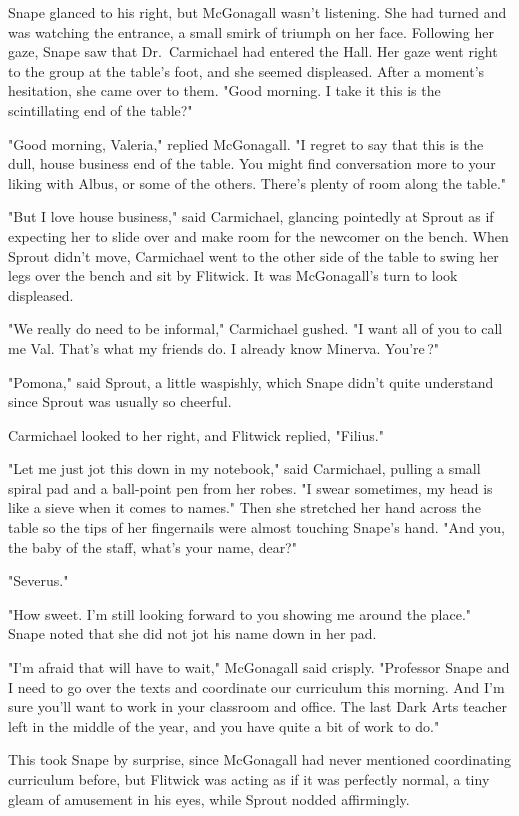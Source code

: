 Snape glanced to his right, but McGonagall wasn't listening. She had turned and was watching the entrance, a small smirk of triumph on her face. Following her gaze, Snape saw that Dr.~Carmichael had entered the Hall. Her gaze went right to the group at the table's foot, and she seemed displeased. After a moment's hesitation, she came over to them. "Good morning. I take it this is the scintillating end of the table?"

"Good morning, Valeria," replied McGonagall. "I regret to say that this is the dull, house business end of the table. You might find conversation more to your liking with Albus, or some of the others. There's plenty of room along the table."

"But I love house business," said Carmichael, glancing pointedly at Sprout as if expecting her to slide over and make room for the newcomer on the bench. When Sprout didn't move, Carmichael went to the other side of the table to swing her legs over the bench and sit by Flitwick. It was McGonagall's turn to look displeased.

"We really do need to be informal," Carmichael gushed. "I want all of you to call me Val. That's what my friends do. I already know Minerva. You're{\el}\,?"

"Pomona," said Sprout, a little waspishly, which Snape didn't quite understand since Sprout was usually so cheerful.

Carmichael looked to her right, and Flitwick replied, "Filius."

"Let me just jot this down in my notebook," said Carmichael, pulling a small spiral pad and a ball-point pen from her robes. "I swear sometimes, my head is like a sieve when it comes to names." Then she stretched her hand across the table so the tips of her fingernails were almost touching Snape's hand. "And you, the baby of the staff, what's your name, dear?"

"Severus."

"How sweet. I'm still looking forward to you showing me around the place." Snape noted that she did not jot his name down in her pad.

"I'm afraid that will have to wait," McGonagall said crisply. "Professor Snape and I need to go over the texts and coordinate our curriculum this morning. And I'm sure you'll want to work in your classroom and office. The last Dark Arts teacher left in the middle of the year, and you have quite a bit of work to do."

This took Snape by surprise, since McGonagall had never mentioned coordinating curriculum before, but Flitwick was acting as if it was perfectly normal, a tiny gleam of amusement in his eyes, while Sprout nodded affirmingly.

